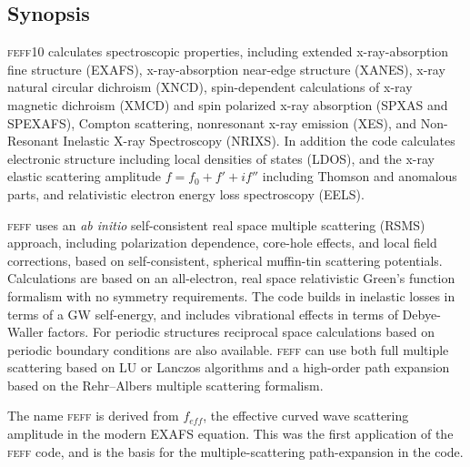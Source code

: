 \documentclass[11pt,oneside]{report} %
\newcommand{\feffcurrent}{\textsc{feff10}}
\newcommand{\program}[1]{\textsc{#1}}
\newcommand{\feff}{\program{feff}}
\begin{document}
\begin{latexonly}
\newchapter{}
\tableofcontents
\newchapter{}

\setcounter{page}{1}









\chapter{Synopsis}
\label{sec:Synopsis}

{\feffcurrent} calculates spectroscopic properties, including
extended x-ray-absorption fine structure (EXAFS), 
x-ray-absorption near-edge structure (XANES), x-ray
natural circular dichroism (XNCD), spin-dependent calculations 
of x-ray magnetic dichroism (XMCD) and spin polarized x-ray absorption 
(SPXAS and SPEXAFS), Compton scattering, nonresonant x-ray emission (XES), and Non-Resonant
Inelastic X-ray Spectroscopy (NRIXS). 
In addition the code calculates electronic structure including local
densities of states (LDOS), and the x-ray elastic scattering amplitude
$f=f_0+f'+if''$ including Thomson and anomalous parts, and relativistic
electron energy loss spectroscopy (EELS). 

{\feff} uses an \textit{ab initio} self-consistent real space multiple 
scattering (RSMS) approach, including 
polarization dependence, core\--hole effects, and local field 
corrections, based on self-consistent, spherical muffin-tin scattering
potentials.  Calculations are based on an all-electron, real space 
relativistic Green's function formalism with no symmetry requirements.
The code builds in inelastic losses in terms of a GW self-energy,
and includes vibrational effects in terms of Debye-Waller
factors.  For periodic structures reciprocal space calculations based on
periodic boundary conditions are also available.
{\feff} can use both full multiple scattering based on LU or Lanczos 
algorithms and a high-order path expansion based on the Rehr--Albers 
multiple scattering formalism.

The name {\feff} is derived from $f_{eff}$, the effective curved wave
scattering amplitude in the modern EXAFS equation.  This was the first
application of the {\feff} code, and is the basis for the 
multiple-scattering path-expansion in the code.


\end{latexonly}
\end{document}
